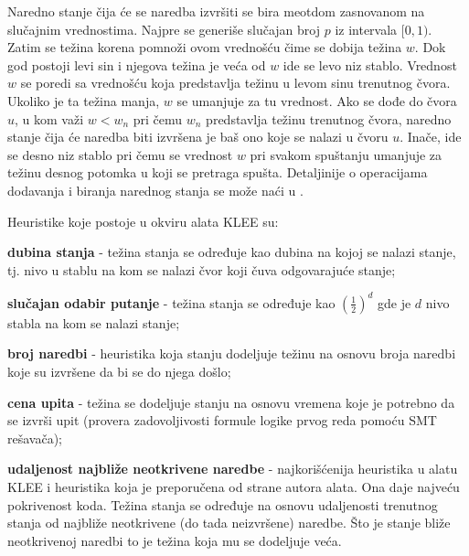 \documentclass[12pt,oneside]{memoir}
\begin{document}
Naredno stanje čija će se naredba izvršiti se bira meotdom zasnovanom na slučajnim vrednostima. Najpre se generiše slučajan broj $p$ iz intervala $[0, 1)$. Zatim se težina korena pomnoži ovom vrednošću čime se dobija težina $w$. Dok god postoji levi sin i njegova težina je veća od $w$ ide se levo niz stablo. Vrednost $w$ se poredi sa vrednošću koja predstavlja težinu u levom sinu trenutnog čvora. Ukoliko je ta težina manja, $w$ se umanjuje za tu vrednost. Ako se dođe do čvora $u$, u kom važi $w < w_n$ pri čemu $w_n$ predstavlja težinu trenutnog čvora, naredno stanje čija će naredba biti izvršena je baš ono koje se nalazi u čvoru $u$. Inače, ide se desno niz stablo pri čemu se vrednost $w$ pri svakom spuštanju umanjuje za težinu desnog potomka u koji se pretraga spušta. Detaljinije o operacijama dodavanja i biranja narednog stanja se može naći u \cite{klee}. 

Heuristike koje postoje u okviru alata KLEE su:
\begin{description}
    \item\textbf{dubina stanja} - težina stanja se određuje kao dubina na kojoj se nalazi stanje, tj. nivo u stablu na kom se nalazi čvor koji čuva odgovarajuće stanje;
    
    \item\textbf{slučajan odabir putanje} - težina stanja se određuje kao $(\frac{1}{2}) ^ d$ gde je $d$ nivo stabla na kom se nalazi stanje;
    
    \item\textbf{broj naredbi} - heuristika koja stanju dodeljuje težinu na osnovu broja naredbi koje su izvršene da bi se do njega došlo;
    
    \item\textbf{cena upita} - težina se dodeljuje stanju na osnovu vremena koje je potrebno da se izvrši upit (provera zadovoljivosti formule logike prvog reda pomoću SMT rešavača);
    
    \item\textbf{udaljenost najbliže neotkrivene naredbe} - najkorišćenija heuristika u alatu KLEE i heuristika koja je preporučena od strane autora alata. Ona daje najveću pokrivenost koda. Težina stanja se određuje na osnovu udaljenosti trenutnog stanja od najbliže neotkrivene (do tada neizvršene) naredbe. Što je stanje bliže neotkrivenoj naredbi to je težina koja mu se dodeljuje veća. 
\end{description}

\bigskip
\end{document}
